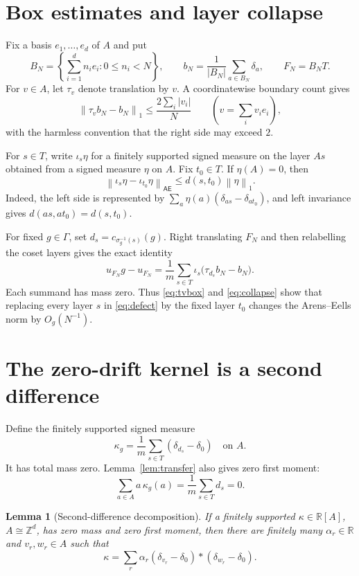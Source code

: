 \documentclass[11pt]{article}
\newtheorem{lemma}{Lemma}
\newcommand{\R}{\mathbb R}
\newcommand{\Z}{\mathbb Z}
\newcommand{\G}{\Gamma}
\newcommand{\AEn}{\mathsf{AE}}
\newcommand{\norm}[1]{\left\lVert#1\right\rVert}
\begin{document}
\section{Box estimates and layer collapse}

Fix a basis $e_1,\ldots,e_d$ of $A$ and put
\[
 B_N=\left\{\sum_{i=1}^d n_ie_i:0\leq n_i<N\right\},
 \qquad b_N=\frac1{|B_N|}\sum_{a\in B_N}\delta_a,
 \qquad F_N=B_NT.
\]
For $v\in A$, let $\tau_v$ denote translation by $v$.  A coordinatewise
boundary count gives
\begin{equation}\label{eq:tvbox}
 \norm{\tau_vb_N-b_N}_1\leq \frac{2\sum_i|v_i|}{N}
 \qquad (v=\textstyle\sum_i v_ie_i),
\end{equation}
with the harmless convention that the right side may exceed $2$.

For $s\in T$, write $\iota_s\eta$ for a finitely supported signed measure
on the layer $As$ obtained from a signed measure $\eta$ on $A$.  Fix
$t_0\in T$.  If $\eta(A)=0$, then
\begin{equation}\label{eq:collapse}
 \norm{\iota_s\eta-\iota_{t_0}\eta}_{\AEn}
 \leq d(s,t_0)\norm{\eta}_1.
\end{equation}
Indeed, the left side is represented by
$\sum_a\eta(a)(\delta_{as}-\delta_{at_0})$, and left invariance gives
$d(as,at_0)=d(s,t_0)$.

For fixed $g\in\G$, set
$d_s=c_{\sigma_g^{-1}(s)}(g)$.  Right translating $F_N$ and then relabelling
the coset layers gives the exact identity
\begin{equation}\label{eq:defect}
 u_{F_N}g-u_{F_N}
 =\frac1m\sum_{s\in T}
   \iota_s\bigl(\tau_{d_s}b_N-b_N\bigr).
\end{equation}
Each summand has mass zero.  Thus \eqref{eq:tvbox} and
\eqref{eq:collapse} show that replacing every layer $s$ in
\eqref{eq:defect} by the fixed layer $t_0$ changes the Arens--Eells norm by
$O_g(N^{-1})$.

\section{The zero-drift kernel is a second difference}

Define the finitely supported signed measure
\[
 \kappa_g=\frac1m\sum_{s\in T}(\delta_{d_s}-\delta_0)
 \quad\text{on }A.
\]
It has total mass zero.  Lemma~\ref{lem:transfer} also gives zero first
moment:
\[
 \sum_{a\in A}a\,\kappa_g(a)=\frac1m\sum_{s\in T}d_s=0.
\]

\begin{lemma}[Second-difference decomposition]\label{lem:square}
If a finitely supported $\kappa\in\R[A]$, $A\cong\Z^d$, has zero mass and
zero first moment, then there are finitely many
$\alpha_r\in\R$ and $v_r,w_r\in A$ such that
\[
 \kappa=\sum_r\alpha_r
 (\delta_{v_r}-\delta_0)*(\delta_{w_r}-\delta_0).
\]
\end{lemma}
\end{document}
